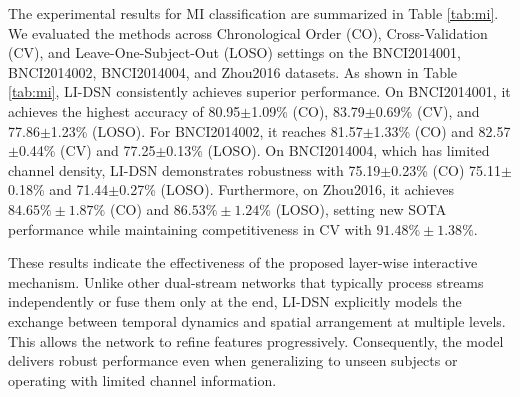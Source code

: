 \documentclass[journal]{IEEEtran}
\theoremstyle{plain}
\begin{document}
The experimental results for MI classification are summarized in Table \ref{tab:mi}. We evaluated the methods across Chronological Order (CO), Cross-Validation (CV), and Leave-One-Subject-Out (LOSO) settings on the BNCI2014001, BNCI2014002, BNCI2014004, and Zhou2016 datasets. As shown in Table \ref{tab:mi}, LI-DSN consistently achieves superior performance. On BNCI2014001, it achieves the highest accuracy of 80.95$\pm$1.09\% (CO), 83.79$\pm$0.69\% (CV), and 77.86$\pm$1.23\% (LOSO). For BNCI2014002, it reaches 81.57$\pm$1.33\% (CO) and 82.57$\pm$0.44\% (CV) and 77.25$\pm$0.13\% (LOSO). On BNCI2014004, which has limited channel density, LI-DSN demonstrates robustness with 75.19$\pm$0.23\% (CO) 75.11$\pm$0.18\% and 71.44$\pm$0.27\% (LOSO). Furthermore, on Zhou2016, it achieves $84.65\% \pm 1.87\%$ (CO) and $86.53\% \pm 1.24\%$ (LOSO), setting new SOTA performance while maintaining competitiveness in CV with $91.48\% \pm 1.38\%$.

These results indicate the effectiveness of the proposed layer-wise interactive mechanism. Unlike other dual-stream networks that typically process streams independently or fuse them only at the end, LI-DSN explicitly models the exchange between temporal dynamics and spatial arrangement at multiple levels. This allows the network to refine features progressively. Consequently, the model delivers robust performance even when generalizing to unseen subjects or operating with limited channel information.

\begin{table}[!htbp]
    \caption{The ablation study of the proposed module and strategy on three MI classification datasets.}
    \renewcommand{\arraystretch}{1.4}
    \centering
    \footnotesize
    \setlength{\tabcolsep}{3.5pt}
    \label{tab:ablation}
\end{table}
\end{document}
